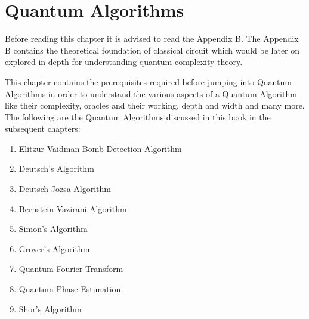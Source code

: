 \documentclass[12pt, oneside]{book}
\theoremstyle{definition}
\theoremstyle{definition}
\theoremstyle{remark}
\begin{document}
\chapter{Quantum Algorithms}
Before reading this chapter it is advised to read the Appendix B. The Appendix B contains the theoretical foundation of classical circuit which would be later on explored in depth for understanding quantum complexity theory.

This chapter contains the prerequisites required before jumping into Quantum Algorithms in order to understand the various aspects of a Quantum Algorithm like their complexity, oracles and their working, depth and width and many more.
The following are the Quantum Algorithms discussed in this book in the subsequent chapters:
\begin{enumerate}
    \item Elitzur-Vaidman Bomb Detection Algorithm
    \item Deutsch's Algorithm
    \item Deutsch-Jozsa Algorithm
    \item Bernstein-Vazirani Algorithm
    \item Simon's Algorithm
    \item Grover's Algorithm
    \item Quantum Fourier Transform
    \item Quantum Phase Estimation
    \item Shor's Algorithm
\end{enumerate}
\end{document}
